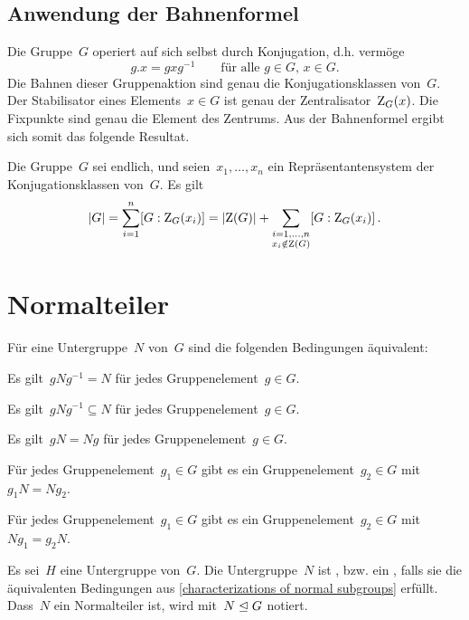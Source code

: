 \subsection{Anwendung der Bahnenformel}

Die Gruppe~$G$ operiert auf sich selbst durch Konjugation, d.h. vermöge
\[
  g.x = g x g^{-1}
  \qquad
  \text{für alle~$g \in G$,~$x \in G$.}
\]
Die Bahnen dieser Gruppenaktion sind genau die Konjugationsklassen von~$G$.
Der Stabilisator eines Elements~$x \in G$ ist genau der Zentralisator~$\operatorname{Z}_G(x)$.
Die Fixpunkte sind genau die Element des Zentrums.
Aus der Bahnenformel ergibt sich somit das folgende Resultat.

\begin{theorem}
  Die Gruppe~$G$ sei endlich, und seien~$x_1, \dotsc, x_n$ ein Repräsentantensystem der Konjugationsklassen von~$G$.
  Es gilt
  \[
    \lvert G\rvert
    =
    \sum_{i=1}^n [G : \operatorname{Z}_G(x_i)]
    =
    \lvert \operatorname{Z}(G) \rvert
    +
    \sum_{\substack{i = 1, \dotsc, n \\ x_i \notin \operatorname{Z}(G)}}
    [G : \operatorname{Z}_G(x_i)] \,.
  \]
\end{theorem}




\section{Normalteiler}

\begin{proposition}
  \label{characterizations of normal subgroups}
  Für eine Untergruppe~$N$ von~$G$ sind die folgenden Bedingungen äquivalent:
  \begin{equivlist}
    \item
      Es gilt~$g N g^{-1} = N$ für jedes Gruppenelement~$g \in G$.
    \item
      Es gilt~$g N g^{-1} \subseteq N$ für jedes Gruppenelement~$g \in G$.
    \item
      Es gilt~$gN = Ng$ für jedes Gruppenelement~$g \in G$.
    \item
      Für jedes Gruppenelement~$g_1 \in G$ gibt es ein Gruppenelement~$g_2 \in G$ mit~$g_1 N = N g_2$.
    \item
      Für jedes Gruppenelement~$g_1 \in G$ gibt es ein Gruppenelement~$g_2 \in G$ mit~$N g_1 = g_2 N$.
  \end{equivlist}
\end{proposition}

\begin{definition}
  Es sei~$H$ eine Untergruppe von~$G$.
  Die Untergruppe~$N$ ist , bzw. ein , falls sie die äquivalenten Bedingungen aus \cref{characterizations of normal subgroups} erfüllt.
  Dass~$N$ ein Normalteiler ist, wird mit~$N \trianglelefteq G$ notiert.
\end{definition}

